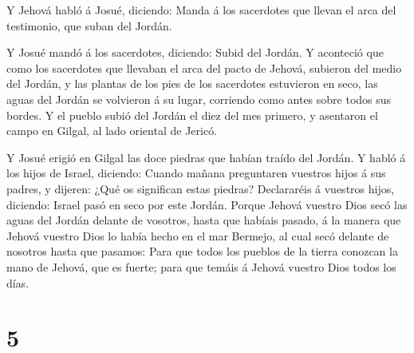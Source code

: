  Y Jehová habló á Josué, diciendo:  Manda á
los sacerdotes que llevan el arca del testimonio, que suban del Jordán.

 Y Josué mandó á los sacerdotes, diciendo: Subid del
Jordán.  Y aconteció que como los sacerdotes que llevaban
el arca del pacto de Jehová, subieron del medio del Jordán, y las
plantas de los pies de los sacerdotes estuvieron en seco, las aguas del
Jordán se volvieron á su lugar, corriendo como antes sobre todos sus
bordes.  Y el pueblo subió del Jordán el diez del mes
primero, y asentaron el campo en Gilgal, al lado oriental de Jericó.

 Y Josué erigió en Gilgal las doce piedras que habían
traído del Jordán.  Y habló á los hijos de Israel,
diciendo: Cuando mañana preguntaren vuestros hijos á sus padres, y
dijeren: ¿Qué os significan estas piedras?  Declararéis á
vuestros hijos, diciendo: Israel pasó en seco por este Jordán.
 Porque Jehová vuestro Dios secó las aguas del Jordán
delante de vosotros, hasta que habíais pasado, á la manera que Jehová
vuestro Dios lo había hecho en el mar Bermejo, al cual secó delante de
nosotros hasta que pasamos:  Para que todos los pueblos de
la tierra conozcan la mano de Jehová, que es fuerte; para que temáis á
Jehová vuestro Dios todos los días.

\hypertarget{section-4}{%
\section{5}\label{section-4}}

